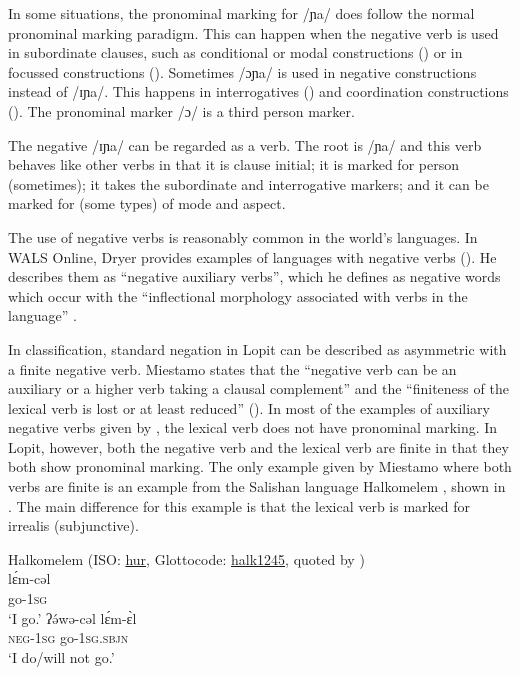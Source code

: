 \documentclass[output=paper,colorlinks,citecolor=brown,draftmode]{langscibook}
\begin{document}
\z 

In some situations, the pronominal marking for /ɲa/ does follow the normal pronominal marking paradigm. This can happen when the negative verb is used in subordinate clauses, such as conditional or modal constructions () or in focussed constructions (). Sometimes /ɔɲa/ is used in negative constructions instead of /ɪɲa/. This happens in interrogatives () and coordination constructions (). The pronominal marker /ɔ/ is a third person marker.

The negative /ɪɲa/ can be regarded as a verb. The root is /ɲa/ and this verb behaves like other verbs in that it is clause initial; it is marked for person (sometimes); it takes the subordinate and interrogative markers; and it can be marked for (some types) of mode and aspect. 

The use of negative verbs is reasonably common in the world’s languages. In WALS Online, Dryer provides examples of languages with negative verbs (\citeyear{Dryer2013}). He describes them as “negative auxiliary verbs”, which he defines as negative words which occur with the “inflectional morphology associated with verbs in the language” \citep{Dryer2013}.

In  classification, standard negation in Lopit can be described as asymmetric with a finite negative verb. Miestamo states that the “negative verb can be an auxiliary or a higher verb taking a clausal complement”  and the “finiteness of the lexical verb is lost or at least reduced” (\citeyear[81]{Miestamo2005}). In most of the examples of auxiliary negative verbs given by \citet[81--87]{Miestamo2005}, the lexical verb does not have pronominal marking.  In Lopit, however, both the negative verb and the lexical verb are finite in that they both show pronominal marking. The only example given by Miestamo where both verbs are finite is an example from the Salishan language Halkomelem \citep[176, 185]{Galloway1993}, shown in . The main difference for this example is that the lexical verb is marked for irrealis (subjunctive).   

\ea\label{ex:lop:added} Halkomelem (ISO: \href{https://iso639-3.sil.org/code/hur}{hur}, Glottocode: \href{https://glottolog.org/resource/languoid/id/halk1245}{halk1245}, \citealt[176, 185]{Galloway1993} quoted by \citealt[83]{Miestamo2005}) \\
  \ea   \gll lɛ́m-cəl \\
            go-\textsc{1sg} \\
        \glt ‘I go.’ 
  \ex   \gll ʔə́wə-cəl lɛ́m-ɛ̀l \\
            \textsc{neg-1sg} go-\textsc{1sg.sbjn} \\
        \glt ‘I do/will not go.’ 
\z\z
\end{document}
